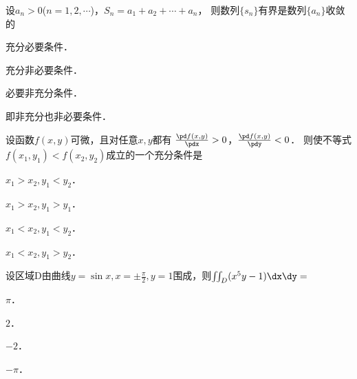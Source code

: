 \documentclass[plain,noanswer,medmath]{../../template/jnuexam}
\begin{document}










\begin{problem}
设$a_n > 0$($n = 1,2, \cdots$)，$S_n = a_1 + a_2 + \cdots + a_n$，
则数列$\{s_n\}$有界是数列$\{a_n\}$收敛的\pickout{}
\begin{abcd}
\item 充分必要条件．
\item 充分非必要条件．
\item 必要非充分条件．
\item 即非充分也非必要条件．
\end{abcd}
\end{problem}




\begin{problem}
设函数$f\left(x,y \right)$可微，且对任意$x,y$都有
$\frac{\pd f(x,y)}{\pdx} > 0$，$\frac{\pd f(x,y)}{\pdy} < 0$．
则使不等式$f\left(x_1,y_1 \right) < f\left(x_2,y_2 \right)$成立的一个充分条件是
\begin{abcd}
\item $x_1 > x_2,y_1 < y_2$．
\item $x_1 > x_2,y_1 > y_1$．
\item $x_1 < x_2,y_1 < y_2$．
\item $x_1 < x_2,y_1 > y_2$．
\end{abcd}
\end{problem}


\begin{problem}
设区域D由曲线$y = \sin x,x = \pm \frac{\pi}{2},y = 1$围成，则$\iint_D (x^5 y - 1)\dx\dy =$\pickout{}
\begin{abcd}
\item $\pi$．
\item $2$．
\item $- 2$．
\item $- \pi$．
\end{abcd}
\end{problem}






\end{document}
